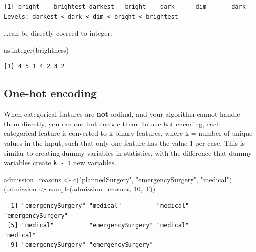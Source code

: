 \documentclass[
]{book}
\newenvironment{Shaded}{\begin{snugshade}}{\end{snugshade}}
\newcommand{\DecValTok}[1]{\textcolor[rgb]{0.00,0.00,0.81}{#1}}
\newcommand{\FunctionTok}[1]{\textcolor[rgb]{0.00,0.00,0.00}{#1}}
\newcommand{\NormalTok}[1]{#1}
\newcommand{\OtherTok}[1]{\textcolor[rgb]{0.56,0.35,0.01}{#1}}
\newcommand{\StringTok}[1]{\textcolor[rgb]{0.31,0.60,0.02}{#1}}
\begin{document}
\begin{verbatim}
[1] bright    brightest darkest   bright    dark      dim       dark     
Levels: darkest < dark < dim < bright < brightest
\end{verbatim}

\ldots can be directly coerced to integer:

\begin{Shaded}
\begin{Highlighting}[]
\FunctionTok{as.integer}\NormalTok{(brightness)}
\end{Highlighting}
\end{Shaded}

\begin{verbatim}
[1] 4 5 1 4 2 3 2
\end{verbatim}

\hypertarget{one-hot-encoding}{%
\subsection{One-hot encoding}\label{one-hot-encoding}}

When categorical features are \textbf{not} ordinal, and your algorithm cannot handle them directly, you can one-hot encode them. In one-hot encoding, each categorical feature is converted to k binary features, where k = number of unique values in the input, such that only one feature has the value 1 per case. This is similar to creating dummy variables in statistics, with the difference that dummy variables create \texttt{k\ -\ 1} new variables.

\begin{Shaded}
\begin{Highlighting}[]
\NormalTok{admission\_reasons }\OtherTok{\textless{}{-}} \FunctionTok{c}\NormalTok{(}\StringTok{"plannedSurgery"}\NormalTok{, }\StringTok{"emergencySurgery"}\NormalTok{, }\StringTok{"medical"}\NormalTok{)}
\NormalTok{(admission }\OtherTok{\textless{}{-}} \FunctionTok{sample}\NormalTok{(admission\_reasons, }\DecValTok{10}\NormalTok{, T))}
\end{Highlighting}
\end{Shaded}

\begin{verbatim}
 [1] "emergencySurgery" "medical"          "medical"          "emergencySurgery"
 [5] "medical"          "emergencySurgery" "medical"          "medical"         
 [9] "emergencySurgery" "emergencySurgery"
\end{verbatim}
\end{document}
